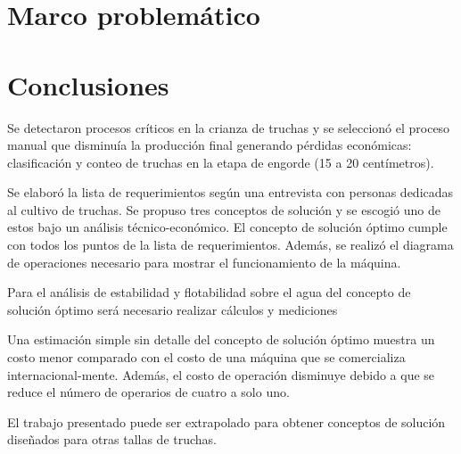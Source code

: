 
\newpage
\clearpage{\pagestyle{empty}\cleardoublepage}
\doublespacing
\chapter{Marco problemático}
\newpage
\pagestyle{after-table-of-content}
\chapter*{\centering \large Conclusiones}


Se detectaron procesos críticos en la crianza de truchas y se seleccionó el proceso manual que disminuía la producción final generando pérdidas económicas: clasificación y conteo de truchas en la etapa de engorde (15 a 20 centímetros).

Se elaboró la lista de requerimientos según una entrevista con personas dedicadas al cultivo de truchas. Se propuso tres conceptos de solución y se escogió uno de estos bajo un análisis técnico-económico. El concepto de solución óptimo cumple con todos los puntos de la lista de requerimientos. Además, se realizó el diagrama de operaciones necesario para mostrar el funcionamiento de la máquina.

Para el análisis de estabilidad y flotabilidad sobre el agua del concepto de solución óptimo será necesario realizar cálculos y mediciones 

Una estimación simple sin detalle del concepto de solución óptimo muestra un costo menor comparado con el costo de una máquina que se comercializa internacional-mente. Además, el costo de operación disminuye debido a que se reduce el número de operarios de cuatro a solo uno.

El trabajo presentado puede ser extrapolado para obtener conceptos de solución diseñados para otras tallas de truchas.

